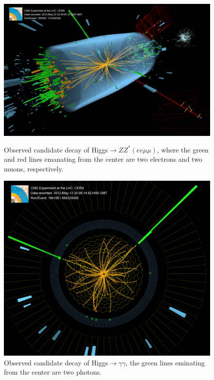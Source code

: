 \begin{figure}
  \centering
  \begin{minipage}[t]{0.49\textwidth}
    \includegraphics[width=\textwidth]{images/higgs}
    \caption{Observed candidate decay of Higgs$ \rightarrow ZZ^\ast (ee\mu\mu)$,
    where the green and red lines emanating from the center are two electrons and
    two muons, respectively.\cite{higgs}}
    \label{fig:higgs}
  \end{minipage}
  \hfill
  \begin{minipage}[t]{0.49\textwidth}
    \includegraphics[width=\textwidth]{images/higgs2}
    \caption{Observed candidate decay of  Higgs$ \rightarrow \gamma\gamma$, the
    green lines eminating from the center are two photons.\cite{higgs2}}
    \label{fig:higgs2}
  \end{minipage}
\end{figure}


